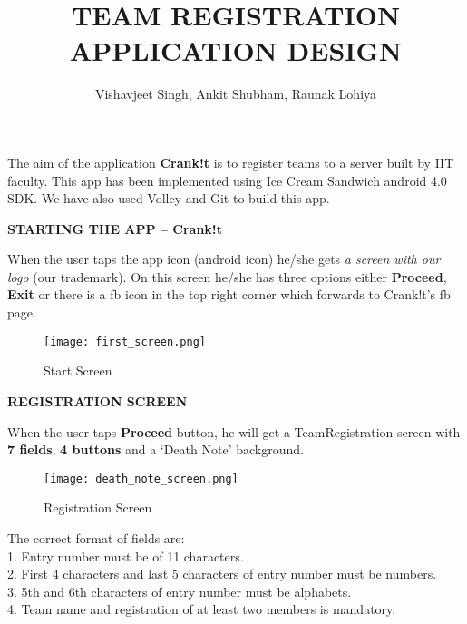 \documentclass{article}
\begin{document}
	\title{\textbf{TEAM REGISTRATION APPLICATION DESIGN}}
	\author{Vishavjeet Singh, Ankit Shubham, Raunak Lohiya}
	\maketitle
	
The aim of the application \textbf{Crank!t} is to register teams to a server built by IIT faculty. 
This app has been implemented using Ice Cream Sandwich android 4.0 SDK. We have also used Volley and Git to build this app.	


\textbf{STARTING THE APP – Crank!t}
	
	
	
When the user taps the app icon (android icon) he/she gets \textit {a screen with our logo} (our trademark). On this screen he/she has three options either \textbf{Proceed}, \textbf{Exit} or there is a fb icon in the top right corner which forwards to Crank!t’s fb page.
\begin{figure}[H]
	\hspace{3cm}\texttt{[image: first\_screen.png]}
	\caption{Start Screen}
\end{figure}

\newpage
\textbf{REGISTRATION SCREEN}

When the user taps \textbf{Proceed} button, he will get a TeamRegistration screen with \textbf{7 fields},\textbf{ 4 buttons} and a ‘Death Note’ background.

\begin{figure}[H]
\hspace*{3cm}\texttt{[image: death\_note\_screen.png]}
\caption{Registration Screen}
\end{figure}

The correct format of fields are:\\
1.	Entry number must be of 11 characters.\\
2.	First 4 characters and last 5 characters of entry number must be numbers.\\
3.	5th and 6th characters of entry number must be alphabets. \\
4.	Team name and registration of at least two members is mandatory. \\
\end{document}
